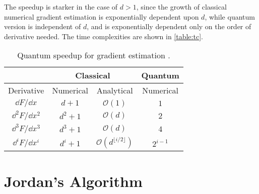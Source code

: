 \documentclass{article}
\begin{document}
The speedup is starker in the case of \(d > 1\), since the growth of classical numerical
gradient estimation is exponentially dependent upon \(d\), while quantum version is
independent of \(d\), and is exponentially dependent only on the order of derivative needed.
The time complexities are shown in  \autoref{table:tc}.

\begin{table}[]
  \centering
  \begin{tabular}{|c || c | c | c |}
    \hline
                           & \multicolumn{2}{c|}{Classical} & \multicolumn{1}{c|}{Quantum}                               \\
    \hline
    Derivative             & Numerical                      & Analytical                                 & Numerical     \\
    \hline
    \(\dd F / \dd x\)      & \(d + 1\)                      & \(\mathcal{O}(1)\)                         & \(1\)         \\
    \(\dd^2 F / \dd x^2\)  & \(d^2 + 1\)                    & \(\mathcal{O}(d)\)                         & \(2\)         \\
    \(\dd^3 F / \dd x^3 \) & \(d^3 + 1\)                    & \(\mathcal{O}(d)\)                         & \(4\)         \\
    \(\dd^i F / \dd x^i\)  & \(d^i + 1\)                    & \(\mathcal{O}(d^{\lfloor i / 2 \rfloor})\) & \(2^{i - 1}\) \\
    \hline
  \end{tabular}
  \caption{Quantum speedup for gradient estimation \cite{0908.1921}.}
  \label{table:tc}
\end{table}

\section{Jordan's Algorithm}
\end{document}
